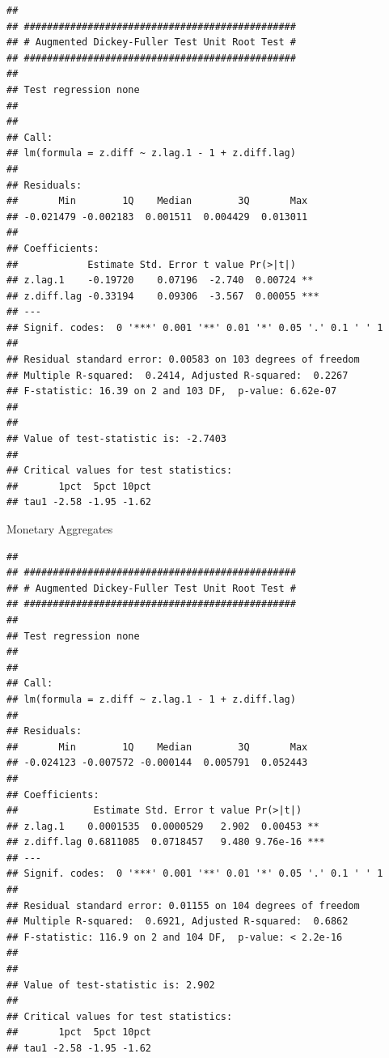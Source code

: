 \documentclass[11pt,preprint, authoryear]{elsarticle}
\numberwithin{equation}{section}
\numberwithin{figure}{section}
\numberwithin{table}{section}
\begin{document}
\begin{verbatim}
## 
## ############################################### 
## # Augmented Dickey-Fuller Test Unit Root Test # 
## ############################################### 
## 
## Test regression none 
## 
## 
## Call:
## lm(formula = z.diff ~ z.lag.1 - 1 + z.diff.lag)
## 
## Residuals:
##       Min        1Q    Median        3Q       Max 
## -0.021479 -0.002183  0.001511  0.004429  0.013011 
## 
## Coefficients:
##            Estimate Std. Error t value Pr(>|t|)    
## z.lag.1    -0.19720    0.07196  -2.740  0.00724 ** 
## z.diff.lag -0.33194    0.09306  -3.567  0.00055 ***
## ---
## Signif. codes:  0 '***' 0.001 '**' 0.01 '*' 0.05 '.' 0.1 ' ' 1
## 
## Residual standard error: 0.00583 on 103 degrees of freedom
## Multiple R-squared:  0.2414, Adjusted R-squared:  0.2267 
## F-statistic: 16.39 on 2 and 103 DF,  p-value: 6.62e-07
## 
## 
## Value of test-statistic is: -2.7403 
## 
## Critical values for test statistics: 
##       1pct  5pct 10pct
## tau1 -2.58 -1.95 -1.62
\end{verbatim}

Monetary Aggregates

\begin{verbatim}
## 
## ############################################### 
## # Augmented Dickey-Fuller Test Unit Root Test # 
## ############################################### 
## 
## Test regression none 
## 
## 
## Call:
## lm(formula = z.diff ~ z.lag.1 - 1 + z.diff.lag)
## 
## Residuals:
##       Min        1Q    Median        3Q       Max 
## -0.024123 -0.007572 -0.000144  0.005791  0.052443 
## 
## Coefficients:
##             Estimate Std. Error t value Pr(>|t|)    
## z.lag.1    0.0001535  0.0000529   2.902  0.00453 ** 
## z.diff.lag 0.6811085  0.0718457   9.480 9.76e-16 ***
## ---
## Signif. codes:  0 '***' 0.001 '**' 0.01 '*' 0.05 '.' 0.1 ' ' 1
## 
## Residual standard error: 0.01155 on 104 degrees of freedom
## Multiple R-squared:  0.6921, Adjusted R-squared:  0.6862 
## F-statistic: 116.9 on 2 and 104 DF,  p-value: < 2.2e-16
## 
## 
## Value of test-statistic is: 2.902 
## 
## Critical values for test statistics: 
##       1pct  5pct 10pct
## tau1 -2.58 -1.95 -1.62
\end{verbatim}
\end{document}
